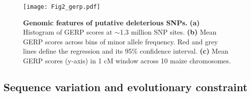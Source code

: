 \documentclass[twoside, twocolumn, letterpaper]{article}
\renewcommand{\baselinestretch}{1}
\begin{document}
\begin{figure*}[tbh]   
  \begin{center}
   \vspace{-2mm}
   \texttt{[image: Fig2\_gerp.pdf]}
   \renewcommand{\baselinestretch}{0.9}
   \vspace{-3mm}
   \caption{{\bfseries Genomic features of putative deleterious SNPs.} \textbf{(a)} Histogram of GERP scores at $\sim$1.3 million SNP sites. 
\textbf{(b)} Mean GERP scores across bins of minor allele frequency. Red and grey lines define the regression and its 95\% confidence interval. \textbf{(c)} Mean GERP scores (y-axis) in 1 cM window across 10 maize chromosomes.} 
\vspace{-4mm}
    \label{fig:gerp}
  \end{center}
\end{figure*}

\subsection*{Sequence variation and evolutionary constraint}
\end{document}
